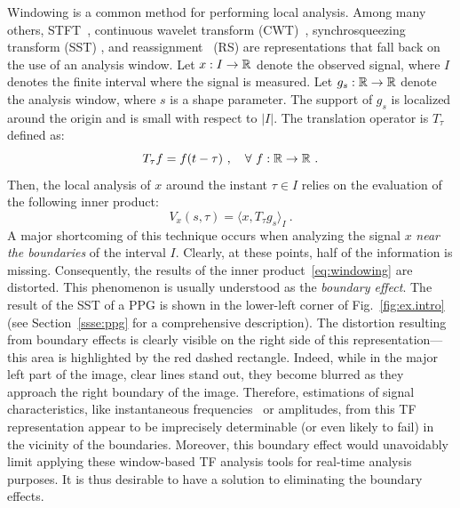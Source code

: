 \documentclass[journal]{IEEEtran}
\begin{document}
Windowing is a common method for performing local analysis. Among many others, STFT~\cite{Flandrin:1999}, continuous wavelet transform (CWT)~\cite{Da1992}, synchrosqueezing transform (SST) \cite{Daubechies11synchrosqueezed}, and reassignment~\cite{Auger13time} (RS) are representations that fall back on the use of an analysis window. Let $x:I\to{\mathbb R}$ denote the observed signal, where $I$ denotes the finite interval where the signal is measured. Let $g_s:{\mathbb R}\to{\mathbb R}$ denote the analysis window, where $s$ is a shape parameter. The support of $g_s$ is localized around the origin and is small with respect to $|I|$. The translation operator is $T_\tau$ defined as:
\[
T_\tau f = f(t-\tau)\ ,\quad \forall\ f:{\mathbb R}\to{\mathbb R}\ .
\]
Then, the local analysis of $x$ around the instant $\tau\in I$ relies on the evaluation of the following inner product:
\begin{equation}
V_x(s,\tau) = \langle x, T_\tau g_s \rangle_I \ .
\label{eq:windowing}
\end{equation}
A major shortcoming of this technique occurs when analyzing the signal $x$ {\em near the boundaries} of the interval $I$. Clearly, at these points, half of the information is missing. Consequently, the results of the inner product~\eqref{eq:windowing} are distorted. This phenomenon is usually understood as the \emph{boundary effect}. The result of the SST of a PPG is shown in the lower-left corner of Fig.~\ref{fig:ex.intro} (see Section~\ref{ssse:ppg} for a comprehensive description). The distortion resulting from boundary effects is clearly visible on the right side of this representation---this area is highlighted by the red dashed rectangle. Indeed, while in the major left part of the image, clear lines stand out, they become blurred as they approach the right boundary of the image. Therefore, estimations of signal characteristics, like instantaneous frequencies~\cite{Delprat92asymptotic} or amplitudes, from this TF representation appear to be imprecisely determinable (or even likely to fail) in the vicinity of the boundaries. Moreover, this boundary effect would unavoidably limit applying these window-based TF analysis tools for real-time analysis purposes. It is thus desirable to have a solution to eliminating the boundary effects.
\end{document}
